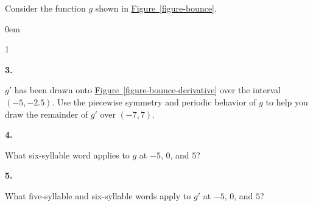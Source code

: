 \documentclass[12pt,]{book}
\theoremstyle{plain}
\theoremstyle{definition}
\numberwithin{equation}{section}
\newcounter{figstack}
\newcounter{figindex}
\newlength\fight
\newcommand\pushValignCaptionBottom[5][b]{%
\stepcounter{figstack}%
\expandafter\def\csname %
figalign\romannumeral\value{figstack}\endcsname{#1}%
\expandafter\def\csname %
figtype\romannumeral\value{figstack}\endcsname{#2}%
\expandafter\def\csname %
figwd\romannumeral\value{figstack}\endcsname{#3}%
\expandafter\def\csname %
figcontent\romannumeral\value{figstack}\endcsname{#4}%
\expandafter\def\csname %
figcap\romannumeral\value{figstack}\endcsname{#5}%
\setbox0=\hbox{%
\begin{#2}{#3}#4\end{#2}}%
\ifdim\dimexpr\ht0+\dp0\relax>\fight\global\setlength{\fight}{%
\dimexpr\ht0+\dp0\relax}\fi%
}
\newcommand\popValignCaptionBottom{%
\setcounter{figindex}{0}%
\hfill%
\whiledo{\value{figindex}<\value{figstack}}{%
\stepcounter{figindex}%
\def\tmp{\csname figwd\romannumeral\value{figindex}\endcsname}%
\begin{\csname figtype\romannumeral\value{figindex}\endcsname}[t]{\tmp}%
\centering%
\stackinset{c}{}%
{\csname figalign\romannumeral\value{figindex}\endcsname}{}%
{\csname figcontent\romannumeral\value{figindex}\endcsname}%
{\rule{0pt}{\fight}}\par%
\csname figcap\romannumeral\value{figindex}\endcsname%
\end{\csname figtype\romannumeral\value{figindex}\endcsname}%
\hfill%
}%
\setcounter{figstack}{0}%
\setlength{\fight}{0pt}%
\hfill%
}
\newenvironment{exercisegroup}%
{\medskip\noindent}%
{\par\bigskip}%
\newlength{\exercisegroupindent}%
\newlength{\exercisegroupitemwidth}%
\newenvironment{exercisegrouplist}%
{\vspace{-\partopsep}%
\begin{adjustwidth}{\exercisegroupindent}{0em}}%
{\end{adjustwidth}%
\vspace{-\partopsep}%
\vspace{\baselineskip}}%
\newenvironment{exercisegroupbycol}[1]%
{\begin{exercisegrouplist}%
\vspace{-\multicolsep}%
\begin{multicols}{#1}%
\setlength{\parindent}{0em}%
\setlength{\exercisegroupitemwidth}{\linewidth}}%
{\end{multicols}%
\vspace{-\multicolsep}%
\end{exercisegrouplist}}%
\newenvironment{exercisegroupitem}[1]%
{\begin{minipage}[t]{\exercisegroupitemwidth}
\vspace{0pt}%
{\bfseries#1}%
\rule{0pt}{\baselineskip}}{\strut%
\end{minipage}%
\hspace{\columnsep}}%
\providecommand\phantomsection{}
\newcommand{\fe}[2]{\mathop{{#1}{\left(#2\right)}}}
\newcommand{\ointerval}[2]{\left(#1,#2\right)}
\newcommand{\fd}[1]{#1'}
\begin{document}
\begin{exercisegroup}%
Consider the function \(g\) shown in \hyperref[figure-bounce]{Figure~\ref*{figure-bounce}}.%
\par
\begin{exercisegroupbycol}{1}%
\begin{exercisegroupitem}{3. }\phantomsection\hypertarget{exercise-232}{\null}
\(\fd{g}\) has been drawn onto \hyperref[figure-bounce-derivative]{Figure~\ref*{figure-bounce-derivative}}  over the interval \(\ointerval{-5}{-2.5}\). Use the piecewise symmetry and periodic behavior of \(g\) to help you draw the remainder of \(\fd{g}\) over \(\ointerval{-7}{7}\).%
\end{exercisegroupitem}%
\par%
\begin{exercisegroupitem}{4. }\phantomsection\hypertarget{exercise-233}{\null}
What six-syllable word applies to \(g\) at \(-5\), \(0\), and \(5\)?%
\end{exercisegroupitem}%
\par%
\begin{exercisegroupitem}{5. }\phantomsection\hypertarget{exercise-234}{\null}
What five-syllable and six-syllable words apply to \(\fd{g}\) at \(-5\), \(0\), and \(5\)?%
\end{exercisegroupitem}%
\par%
\end{exercisegroupbycol}%
\end{exercisegroup}%
\typeout{************************************************}
\typeout{************************************************}
\end{document}
